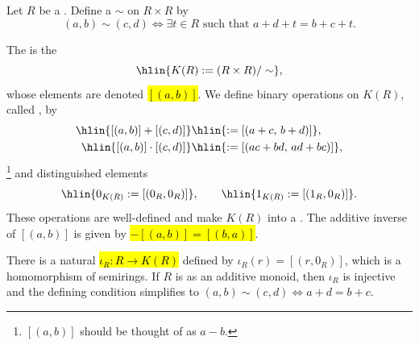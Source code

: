 \begin{definition} \label{definition:grothendieck_ring_of_a_commutative_semiring}
    Let $R$ be a . Define a  $\sim$ on $R \times R$ by
    $$(a,b) \sim (c,d) \iff \exists t \in R \text{ such that } a + d + t = b + c + t.$$

    The  is the 
    $$\hlin{K(R) := (R \times R) / \sim},$$
    whose elements are  denoted \hl{$[(a,b)]$}. We define binary operations on $K(R)$, called , by
    \begin{align*}
        \hlin{[(a,b)] + [(c,d)]} &\hlin{:= [(a + c,\, b + d)]}, \\
        \hlin{[(a,b)] \cdot [(c,d)]} &\hlin{:= [(ac + bd,\, ad + bc)]},
    \end{align*}
    \footnote{$[(a,b)]$ should be thought of as $a-b$.}
    and distinguished elements
    $$\hlin{0_{K(R)} := [(0_R, 0_R)]}, \qquad \hlin{1_{K(R)} := [(1_R, 0_R)]}.$$
    These operations are well-defined and make $K(R)$ into a . The additive inverse of $[(a,b)]$ is given by \hl{$-[(a,b)] = [(b,a)]$}.

    There is a natural  \hl{$\iota_R: R \to K(R)$} defined by $\iota_R(r) = [(r, 0_R)]$, which is a homomorphism of semirings. If $R$ is  as an additive monoid, then $\iota_R$ is injective and the defining condition simplifies to $(a,b) \sim (c,d) \iff a + d = b + c$.
\end{definition}